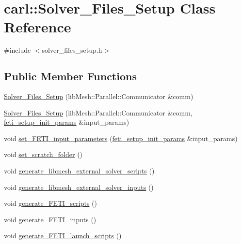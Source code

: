 \hypertarget{classcarl_1_1_solver___files___setup}{}\section{carl\+:\+:Solver\+\_\+\+Files\+\_\+\+Setup Class Reference}
\label{classcarl_1_1_solver___files___setup}


{\ttfamily \#include $<$solver\+\_\+files\+\_\+setup.\+h$>$}

\subsection*{Public Member Functions}
\begin{DoxyCompactItemize}
\item 
\hyperlink{classcarl_1_1_solver___files___setup_a3ec49594b5d36111fd620102b6117b7d}{Solver\+\_\+\+Files\+\_\+\+Setup} (lib\+Mesh\+::\+Parallel\+::\+Communicator \&comm)
\item 
\hyperlink{classcarl_1_1_solver___files___setup_adf5f75ea298463d58590664d484f9450}{Solver\+\_\+\+Files\+\_\+\+Setup} (lib\+Mesh\+::\+Parallel\+::\+Communicator \&comm, \hyperlink{structcarl_1_1feti__setup__init__params}{feti\+\_\+setup\+\_\+init\+\_\+params} \&input\+\_\+params)
\item 
void \hyperlink{classcarl_1_1_solver___files___setup_a87e477dc138d63a172b785f48baba365}{set\+\_\+\+F\+E\+T\+I\+\_\+input\+\_\+parameters} (\hyperlink{structcarl_1_1feti__setup__init__params}{feti\+\_\+setup\+\_\+init\+\_\+params} \&input\+\_\+params)
\item 
void \hyperlink{classcarl_1_1_solver___files___setup_a766a42998204e2e49f415d8113c363a9}{set\+\_\+scratch\+\_\+folder} ()
\item 
void \hyperlink{classcarl_1_1_solver___files___setup_a52633b6904f99452356a03b009552bed}{generate\+\_\+libmesh\+\_\+external\+\_\+solver\+\_\+scripts} ()
\item 
void \hyperlink{classcarl_1_1_solver___files___setup_a7668bba3269e9e977bf24ab93c273b7b}{generate\+\_\+libmesh\+\_\+external\+\_\+solver\+\_\+inputs} ()
\item 
void \hyperlink{classcarl_1_1_solver___files___setup_a731e6149078094536142c4cd5ae18b95}{generate\+\_\+\+F\+E\+T\+I\+\_\+scripts} ()
\item 
void \hyperlink{classcarl_1_1_solver___files___setup_a8d8d2ae8fc0694693adc64acab82f841}{generate\+\_\+\+F\+E\+T\+I\+\_\+inputs} ()
\item 
void \hyperlink{classcarl_1_1_solver___files___setup_a26d5b9fb197fcd896397c3883143fd76}{generate\+\_\+\+F\+E\+T\+I\+\_\+launch\+\_\+scripts} ()
\end{DoxyCompactItemize}
